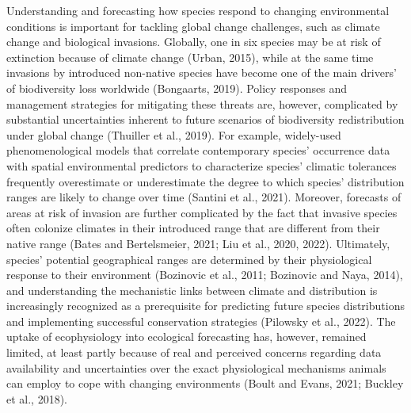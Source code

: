 \documentclass[10pt, twoside]{book} %
\begin{document}
Understanding and forecasting how species respond to changing environmental conditions is important for tackling global change challenges, such as climate change and biological invasions. Globally, one in six species may be at risk of extinction because of climate change (Urban, 2015), while at the same time invasions by introduced non-native species have become one of the main drivers' of biodiversity loss worldwide (Bongaarts, 2019). Policy responses and management strategies for mitigating these threats are, however, complicated by substantial uncertainties inherent to future scenarios of biodiversity redistribution under global change (Thuiller et al., 2019). For example, widely-used phenomenological models that correlate contemporary species' occurrence data with spatial environmental predictors to characterize species' climatic tolerances frequently overestimate or underestimate the degree to which species' distribution ranges are likely to change over time (Santini et al., 2021). Moreover, forecasts of areas at risk of invasion are further complicated by the fact that invasive species often colonize climates in their introduced range that are different from their native range (Bates and Bertelsmeier, 2021; Liu et al., 2020, 2022). Ultimately, species' potential geographical ranges are determined by their physiological response to their environment (Bozinovic et al., 2011; Bozinovic and Naya, 2014), and understanding the mechanistic links between climate and distribution is increasingly recognized as a prerequisite for predicting future species distributions and implementing successful conservation strategies (Pilowsky et al., 2022). The uptake of ecophysiology into ecological forecasting has, however, remained limited, at least partly because of real and perceived concerns regarding data availability and uncertainties over the exact physiological mechanisms animals can employ to cope with changing environments (Boult and Evans, 2021; Buckley et al., 2018).\\
\end{document}
